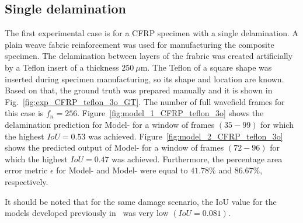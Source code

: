 \begin{sloppypar}
	\subsection{Single delamination}
	The first experimental case is for a CFRP specimen with a single delamination. 
	A plain weave fabric reinforcement was used for manufacturing the composite specimen.
	The delamination between layers of the frabric was created artificially by a Teflon insert of a thickness \(250\ \mu\)m. 
	The Teflon of a square shape was inserted during specimen manufacturing, so its shape and location are known.
	Based on that, the ground truth was prepared manually and it is shown in Fig.~\ref{fig:exp_CFRP_teflon_3o_GT}. 
	The number of full wavefield frames for this case is \(f_n=256\).
	Figure~\ref{fig:model_1_CFRP_teflon_3o} shows the delamination prediction for Model- for a window of frames \((35-99)\) for which the highest \(IoU=0.53\) was achieved.
	Figure~\ref{fig:model_2_CFRP_teflon_3o} shows the predicted output of Model- for a window of frames \((72-96)\) for which the highest \(IoU=0.47\) was achieved.
	Furthermore, the percentage area error metric \(\epsilon\) for Model- and Model- were equal to \(41.78 \%\) and \(86.67\%\), respectively.
	
	It should be noted that for the same damage scenario, the IoU value for the models developed previously in~\cite{Ijjeh2021} was very low \((IoU=0.081)\).
	

\end{sloppypar}
